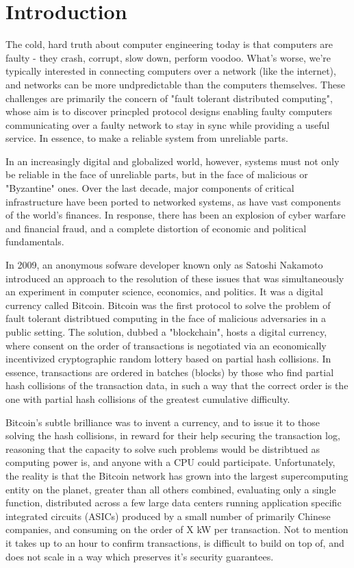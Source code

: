 \chapter{Introduction}
\label{ch:intro}

The cold, hard truth about computer engineering today is that computers are faulty - 
they crash, corrupt, slow down, perform voodoo. 
What's worse, we're typically interested in connecting computers over a network (like the internet),
and networks can be more undpredictable than the computers themselves.
These challenges are primarily the concern of "fault tolerant distributed computing",
whose aim is to discover princpled protocol designs enabling faulty computers communicating over a faulty network 
to stay in sync while providing a useful service.
In essence, to make a reliable system from unreliable parts.

In an increasingly digital and globalized world, however, 
systems must not only be reliable in the face of unreliable parts, but in the face of malicious or "Byzantine" ones.
Over the last decade, major components of critical infrastructure have been ported to networked systems,
as have vast components of the world's finances.
In response, there has been an explosion of cyber warfare and financial fraud,
and a complete distortion of economic and political fundamentals.

In 2009, an anonymous sofware developer known only as Satoshi Nakamoto introduced an approach to the resolution of these issues 
that was simultaneously an experiment in computer science, economics, and politics. 
It was a digital currency called Bitcoin.
Bitcoin was the first protocol to solve the problem of fault tolerant distribtued computing in the face of malicious adversaries in a public setting.
The solution, dubbed a "blockchain", hosts a digital currency, 
where consent on the order of transactions is negotiated via an economically incentivized cryptographic random lottery based on partial hash collisions.
In essence, transactions are ordered in batches (blocks) by those who find partial hash collisions of the transaction data, 
in such a way that the correct order is the one with partial hash collisions of the greatest cumulative difficulty.

Bitcoin's subtle brilliance was to invent a currency, and to issue it to those solving the hash collisions, in reward for their help securing the transaction log,
reasoning that the capacity to solve such problems would be distribtued as computing power is, and anyone with a CPU could participate.
Unfortunately, the reality is that the Bitcoin network has grown into the largest supercomputing entity on the planet, greater than all others combined,
evaluating only a single function, distributed across a few large data centers running application specific integrated circuits (ASICs) produced by a small number of primarily Chinese companies, and consuming on the order of X kW per transaction.
Not to mention it takes up to an hour to confirm transactions, is difficult to build on top of, and does not scale in a way which preserves it's security guarantees.

